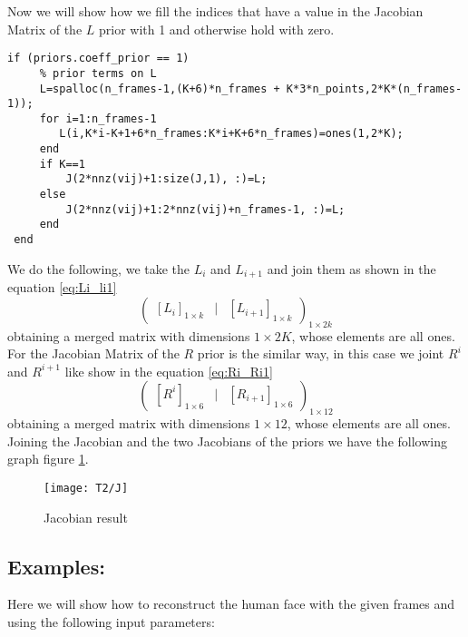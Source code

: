 \noindent Now we will show how we fill the indices that have a value in the Jacobian Matrix of the $L$ prior with 1 and otherwise hold with zero.\\
\begin{lstlisting}[style=Matlab-editor]
if (priors.coeff_prior == 1)
     % prior terms on L
     L=spalloc(n_frames-1,(K+6)*n_frames + K*3*n_points,2*K*(n_frames-1));     
     for i=1:n_frames-1
        L(i,K*i-K+1+6*n_frames:K*i+K+6*n_frames)=ones(1,2*K);        
     end
     if K==1
         J(2*nnz(vij)+1:size(J,1), :)=L;
     else
         J(2*nnz(vij)+1:2*nnz(vij)+n_frames-1, :)=L;
     end
 end 
\end{lstlisting}
\noindent We do the following, we take the $L_{i}$ and $L_{i+1}$ and join them as shown in the equation \ref{eq:Li_li1}
\begin{equation}\label{eq:Li_li1}
\begin{pmatrix}
[L_{i}]_{1\times k} & | & [L_{i+1}]_{1\times k}
\end{pmatrix}_{1\times 2k}
\end{equation}
\noindent obtaining a merged matrix with dimensions $1\times 2K$, whose elements are all ones.\\

\noindent For the Jacobian Matrix of the $R$ prior is the similar way, in this case we joint $R^{i}$ and $R^{i+1}$ like show in the equation \ref{eq:Ri_Ri1}
\begin{equation}\label{eq:Ri_Ri1}
\begin{pmatrix}
[R^{i}]_{1\times 6} & | & [R_{i+1}]_{1\times 6}
\end{pmatrix}_{1\times 12}
\end{equation}
\noindent obtaining a merged matrix with dimensions $1\times 12$, whose elements are all ones.\\
\noindent Joining the Jacobian and the two Jacobians of the priors we have the following graph figure \ref{fig:J}. 

\begin{figure}[h]
    \centering
    \texttt{[image: T2/J]}
    \caption{Jacobian result}
    \label{fig:J}
\end{figure}

\subsection{Examples:}
\noindent Here we will show how to reconstruct the human face with the given frames and using the following input parameters:

